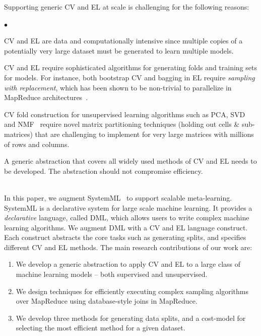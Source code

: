 \documentclass{vldb}
\newcommand{\topic}[1]{\par \smallskip \smallskip \noindent{\bf \uline{#1}}}
\newenvironment{mylist}{\begin{list}{$\bullet$}
    {   \setlength{\itemsep}{2pt}
	        \setlength{\leftmargin}{10pt}
			        \setlength{\topsep}{2pt}}
					    }
						{\end{list}}
\begin{document}
Supporting generic CV and EL at scale is challenging for the following reasons:

\begin{mylist}
\item CV and EL are data and computationally intensive since multiple copies of a potentially very large
dataset must be generated to learn multiple models.

\item CV and EL require sophisticated algorithms for generating folds and training sets for models. For instance, both bootstrap CV and bagging in EL require {\em sampling with replacement}, which has been shown to be non-trivial to parallelize in MapReduce architectures~\cite{planet}.

\item CV fold construction for unsupervised learning algorithms such as PCA, SVD and
NMF~\cite{DBLP:conf/nips/LeeS00} require novel matrix partitioning techniques
(holding out cells \& sub-matrices) that are challenging to implement for very
large matrices with millions of rows and columns.

\item A generic abstraction that covers all widely used methods of CV and EL needs to be developed. The abstraction should not compromise efficiency.

\end{mylist}

\topic{Our Contributions}\\
In this paper, we augment SystemML~\cite{systemml} to support scalable meta-learning. SystemML is a
declarative system for large scale machine learning. It provides a {\em declarative} language,
called DML, which allows users to write complex machine learning algorithms. We augment DML with a CV and EL
language construct. Each construct abstracts the core tasks such as generating splits, and specifies
different CV and EL methods. The main research contributions of our work are:

\begin{enumerate}
\item We develop a generic abstraction to apply CV and EL to a large
class of machine learning models -- both supervised and unsupervised.

\item We design techniques for efficiently executing
complex sampling algorithms over MapReduce using database-style joins in MapReduce.

\item We develop three methods for generating data splits, and a cost-model for selecting the most efficient method for a given dataset.
\end{enumerate}
\end{document}
